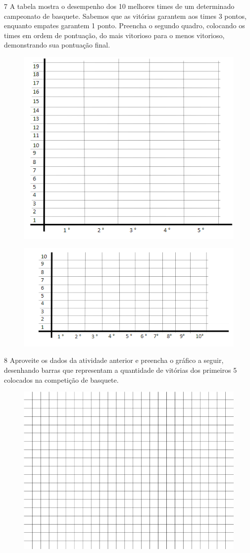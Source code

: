 \num{7} A tabela mostra o desempenho dos 10 melhores times de um
determinado campeonato de basquete. Sabemos que as vitórias garantem aos
times 3 pontos, enquanto empates garantem 1 ponto. Preencha o segundo quadro,
colocando os times em ordem de pontuação, do mais vitorioso para o menos
vitorioso, demonstrando sua pontuação final.


\begin{figure}[htpb!]
\centering
\includegraphics[width=.75\textwidth]{./media/image94.png}
\end{figure}

\begin{figure}[htpb!]
\centering
\includegraphics[width=.65\textwidth]{./media/image95.png}
\end{figure}

\num{8} Aproveite os dados da atividade anterior e preencha o gráfico a seguir,
desenhando barras que representam a quantidade de vitórias dos primeiros
5 colocados na competição de basquete.

\begin{figure}[htpb!]
\centering
\includegraphics[width=.6\textwidth]{./media/image96.png}
\end{figure}

